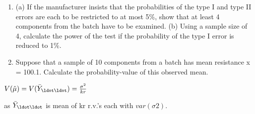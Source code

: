 \documentclass[a4paper,12pt]{article}
\begin{document}
\begin{enumerate}
\begin{enumerate}
    \item  (a) If the manufacturer insists that the probabilities of the type I and
type II errors are each to be restricted to at most 5\%, show that at
least 4 components from the batch have to be examined.
(b) Using a sample size of 4, calculate the power of the test if the
probability of the type I error is reduced to 1\%. 
\item  Suppose that a sample of 10 components from a batch has mean
resistance x = 100.1.
Calculate the probability-value of this observed mean. 
\end{enumerate}


\end{enumerate}
\newpage


$V(\hat{\mu} ) = V(\bar{Y}_{\ldot \ldot} ) =

\frac{\sigma^2}{kr}$


as $\bar{Y}_{\ldot \ldot}$ is mean of kr r.v.’s each with $var(\sigma2)$.
\end{document}
